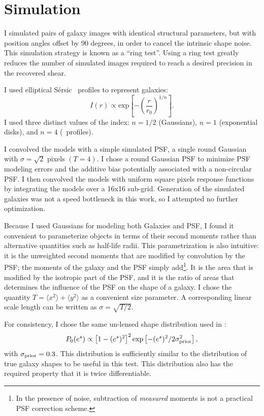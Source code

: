 \documentclass[12pt,preprint]{aastex}
\newcommand{\sersic}{S\'{e}rsic}
\begin{document}
\section{Simulation} \label{sec:sim}

I simulated pairs of galaxy images with identical structural parameters, but
with position angles offset by 90 degrees, in order to cancel the intrinsic
shape noise.  This simulation strategy is known as a ``ring
test''\citep{Nakajima2007}. Using a ring test greatly reduces the number of
simulated images required to reach a desired precision in the recovered shear.

I used elliptical \sersic\ \citep{Sersic63} profiles to represent galaxies:
\begin{equation}
I(r) \varpropto \mathrm{exp} \left[ -\left( \frac{r}{r_0} \right)^{1/n} \right].
\end{equation}
I used three distinct values of the index: $n=1/2$ (Gaussians), $n=1$ (exponential
disks), and $n=4$ (\devauc\ profiles).

I convolved the models with a simple simulated PSF, a single round Gaussian
with $\sigma = \sqrt{2}$ pixels $(T=4)$.  I chose a round Gaussian PSF to
minimize PSF modeling errors and the additive bias potentially associated with
a non-circular PSF.  I then convolved the models with uniform square pixels
response functions by integrating the models over a 16x16 sub-grid.  Generation
of the simulated galaxies was not a speed bottleneck in this work, so I
attempted no further optimization.

Because I used Gaussians for modeling both Galaxies and PSF, I found it
convenient to parameterize objects in terms of their second moments rather than
alternative quantities such as half-life radii.  This parametrization is also
intuitive: it is the unweighted second moments that are modified by convolution
by the PSF; the moments of the galaxy and the PSF simply add\footnote{In the
presence of noise, subtraction of {\it measured} moments is not a practical PSF
correction scheme.}.  It is the area that is modified by the isotropic part of
the PSF, and it is the ratio of areas that determines the influence of the PSF
on the shape of a galaxy.  I chose the quantity $T = \langle x^2 \rangle +
\langle y^2 \rangle$ as a convenient size parameter.  A corresponding linear
scale length can be written as $\sigma = \sqrt{T/2}$.

For consistency, I chose the same un-lensed shape distribution
used in \cite{ba14}:
\begin{equation}
P_0(e^s)\propto \left[1-(e^s)^2\right]^2 \exp\left[-(e^s)^2/2\sigma_{\rm prior}^2\right],
\end{equation}
with $\sigma_{\rm prior}=0.3$. This distribution is sufficiently similar to the
distribution of true galaxy shapes to be useful in this test.  This
distribution also has the required property that it is twice differentiable.
\end{document}
